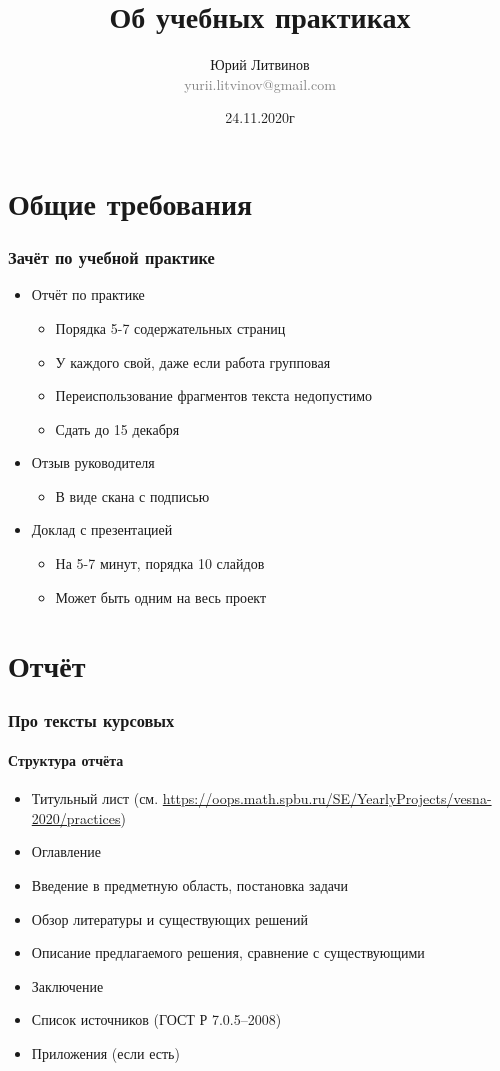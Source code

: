 \documentclass[xetex,mathserif,serif]{beamer}
\title{Об учебных практиках}
\author[Юрий Литвинов]{Юрий Литвинов\\\small{\textcolor{gray}{yurii.litvinov@gmail.com}}}
\date{24.11.2020г}
\begin{document}
    \frame{\titlepage}

    \section{Общие требования}

    \begin{frame}
        \frametitle{Зачёт по учебной практике}
        \begin{itemize}
            \item Отчёт по практике
            \begin{itemize}
                \item Порядка 5-7 содержательных страниц
                \item У каждого свой, даже если работа групповая
                \item Переиспользование фрагментов текста недопустимо
                \item Сдать до 15 декабря
            \end{itemize}
            \item Отзыв руководителя
            \begin{itemize}
                \item В виде скана с подписью
            \end{itemize}
            \item Доклад с презентацией
            \begin{itemize}
                \item На 5-7 минут, порядка 10 слайдов
                \item Может быть одним на весь проект
            \end{itemize}
        \end{itemize}
    \end{frame}

    \section{Отчёт}

    \begin{frame}
        \frametitle{Про тексты курсовых}
        \framesubtitle{Структура отчёта}
        \begin{itemize}
            \item Титульный лист (см. \url{https://oops.math.spbu.ru/SE/YearlyProjects/vesna-2020/practices})
            \item Оглавление
            \item Введение в предметную область, постановка задачи
            \item Обзор литературы и существующих решений
            \item Описание предлагаемого решения, сравнение с существующими
            \item Заключение
            \item Список источников (ГОСТ Р 7.0.5--2008)
            \item Приложения (если есть)
        \end{itemize}
    \end{frame}
\end{document}
